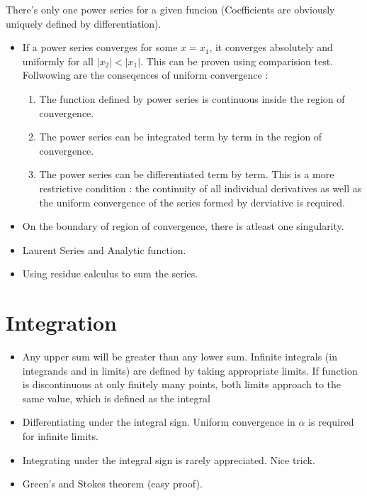 \documentclass{report}
\begin{document}
There's only one power series for a given funcion (Coefficients are obviously uniquely defined by differentiation).

\begin{itemize}

  \item If a power series converges for some $x=x_1$, it converges absolutely and uniformly for all $|x_2| < |x_1|$. This can be proven using comparision test.\\

    Follwowing are the conseqences of uniform convergence :

    \begin{enumerate}
      \item The function defined by power series is continuous inside the region of convergence. 

      \item The power series can be integrated term by term in the region of convergence.

      \item The power series can be differentiated term by term. This is a more restrictive condition : the continuity of all individual derivatives as well as  the uniform convergence of the series formed by derviative is required.

    \end{enumerate}

  \item On the boundary of region of convergence, there is atleast one singularity.

  \item Laurent Series and Analytic function.

  \item Using residue calculus to sum the series.

\end{itemize}

\chapter{Integration}

\begin{itemize}

  \item Any upper sum will be greater than any lower sum. Infinite integrals (in integrands and in limits) are defined by taking appropriate limits. If function is discontinuous at only finitely many points, both limits approach to the same value, which is defined as the integral

  \item Differentiating under the integral sign. Uniform convergence in $\alpha$ is required for infinite limits.

  \item Integrating under the integral sign is rarely appreciated. Nice trick.

  \item Green's and Stokes theorem (easy proof).

\end{itemize}
\end{document}
